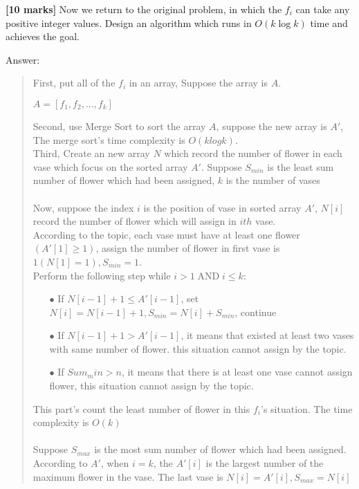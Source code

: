 \documentclass{article}
\DeclareMathOperator{\AND}{AND}
\begin{document}
\begin{Question}
\clearpage
\begin{Subquestion}
\textbf{[10 marks]} Now we return to the original problem, in which the $f_i$ can take any positive integer values. Design an algorithm which runs in $O(k \log k)$ time and achieves the goal.

\begin{answer}
Answer:
\begin{quote}
    First, put all of the $f_i$ in an array, Suppose the array is $A$.
    \begin{center}
        $A = [f_1, f_2, ..., f_k]$
    \end{center}
    Second, use Merge Sort to sort the array $A$, suppose the new array is $A'$, The merge sort's time complexity is $O(klogk)$.\\
    Third, Create an new array $N$ which record the number of flower in each vase which focus on the sorted array $A'$. Suppose $S_{min}$ is the least sum number of flower which had been assigned, $k$ is the number of vases\\\\
    Now, suppose the index $i$ is the position of vase in sorted array $A'$, $N[i]$ record the number of flower which will assign in $ith$ vase.\\
    According to the topic, each vase must have at least one flower$(A'[1] \geq 1)$, assign the number of flower in first vase is $1 (N[1] = 1), S_{min} = 1$.\\
    Perform the following step while $ i > 1 \AND i \leq k $:
    \begin{itemize}
        \item[$\bullet$] If $N[i-1] + 1 \leq A'[i-1]$, set $N[i] = N[i-1] + 1, S_{min} = N[i] + S_{min}$, continue
        \item[$\bullet$] If $N[i-1] + 1 > A'[i-1]$, it means that existed at least two vases with same number of flower. this situation cannot assign by the topic.
        \item[$\bullet$] If $Sum_min > n$, it means that there is at least one vase cannot assign flower, this situation cannot assign by the topic.
    \end{itemize}
    This part's count the least number of flower in this $f_i$'s situation. The time complexity is $O(k)$\\\\
    Suppose $S_{max}$ is the most sum number of flower which had been assigned.
    According to $A'$, when $i = k$, the $A'[i]$ is the largest number of the maximum flower in the vase. The last vase is $N[i] = A'[i], S_{max} = N[i]$ \\

\end{quote}
\end{answer}
\end{Subquestion}
\end{Question}
\end{document}
